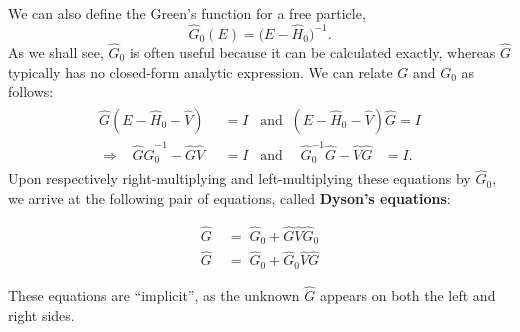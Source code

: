 \documentclass[pra,12pt]{revtex4-2}
\begin{document}
We can also define the Green's function for a free particle,
\begin{equation}
  \hat{G}_0(E)=\big(E-\hat{H}_0\big)^{-1}.
  \label{G0unregulated}
\end{equation}
As we shall see, $\hat{G}_0$ is often useful because it can be
calculated exactly, whereas $\hat{G}$ typically has no closed-form
analytic expression.  We can relate $G$ and $G_0$ as follows:
\begin{align}
  \begin{aligned}
    \hat{G}(E-\hat{H}_0 - \hat{V})\;\; &= I \;\;\;\mathrm{and}\;\; (E-\hat{H}_0 - \hat{V})\hat{G} = I \\ \Rightarrow \;\;\; \hat{G} \hat{G}_0^{-1} - \hat{G}\hat{V} &= I \;\;\; \mathrm{and}\;\;\;\;\, \hat{G}_0^{-1} \hat{G} - \hat{V}\hat{G} \;\;\;= I.
  \end{aligned}
\end{align}
Upon respectively right-multiplying and left-multiplying these equations
by $\hat{G}_0$, we arrive at the following pair of equations, called
\textbf{Dyson's equations}:
\begin{framed}
  \begin{align}
    \hat{G} \;&= \; \hat{G}_0 + \hat{G}\hat{V}\hat{G}_0 \\
    \hat{G} \;&=\; \hat{G}_0 + \hat{G}_0\hat{V}\hat{G} \label{dyson2}
  \end{align}
\end{framed}
\vskip-0.1in
\noindent
These equations are ``implicit'', as the unknown $\hat{G}$ appears on
both the left and right sides.
\end{document}

